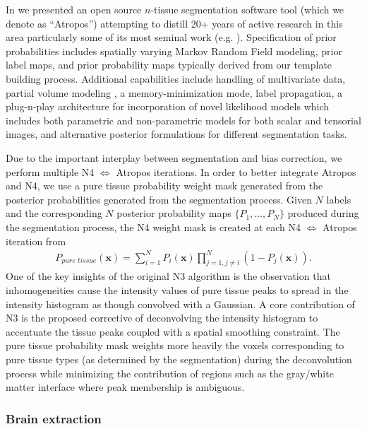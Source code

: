 In \cite{Avants2011a} we presented an open source $n$-tissue segmentation software tool
(which we denote as ``Atropos'') attempting to distill 20+ years of active research in this area
particularly some of its most seminal work (e.g. \cite{zhang2001,ashburner2005}). 
Specification of prior probabilities includes spatially varying Markov Random Field modeling, 
prior label maps, and prior probability maps typically derived from our template building 
process.  Additional
capabilities include handling of multivariate data, 
partial volume modeling \cite{shattuck2001}, a memory-minimization mode,
label propagation, a plug-n-play architecture for incorporation of novel likelihood models
which includes both parametric and non-parametric models for both scalar and tensorial
images, and alternative posterior formulations for different segmentation tasks.

Due to the important interplay between segmentation and bias correction,
we perform multiple N4 $\Leftrightarrow$ Atropos iterations.
In order to better integrate Atropos and N4, we use  
a pure tissue probability weight mask generated from the 
posterior probabilities generated from the segmentation 
process.  Given $N$ labels and the corresponding $N$
posterior probability maps $\{ P_1, \ldots, P_N\}$ produced
during the segmentation process, the N4 weight mask is 
created at each N4 $\Leftrightarrow$ Atropos iteration from
\begin{align}
  P_{pure\,\,tissue}(\mathbf{x}) = \sum_{i=1}^N P_i(\mathbf{x}) \prod_{j=1, j \neq i}^N \left( 1 - P_j(\mathbf{x}) \right).
\end{align}
One of the key insights of the original N3 algorithm is the
observation that inhomogeneities cause the intensity values of
pure tissue peaks to spread in the intensity histogram as though
convolved with a Gaussian.  A core contribution of N3 is the
proposed corrective of deconvolving the intensity histogram to 
accentuate the tissue peaks coupled with a spatial smoothing 
constraint. The pure tissue probability mask
weights more heavily the voxels corresponding to pure tissue 
types (as determined by the segmentation) during the deconvolution process 
while minimizing the contribution of regions such as the gray/white matter 
interface where peak membership is ambiguous. 

\subsubsection{Brain extraction}

